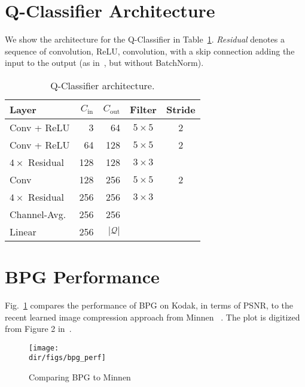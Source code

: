 \begin{subappendices} 
\appendixheader

\section{Q-Classifier Architecture}
\label{rc:sec:qcarch}

We show the architecture for the Q-Classifier in Table~\ref{rc:table:qcarch}. \emph{Residual} denotes a sequence of convolution, ReLU, convolution, with a skip connection adding the input to the output (as in~\cite{he2016deep}, but without BatchNorm).

\begin{table}[h!]
    \centering
    \begin{tabular}{lrrcc}
        \toprule
        Layer &  $C_\text{in}$ & $C_\text{out}$ & Filter & Stride 
        \\ \midrule 
        Conv + ReLU  & 3 & 64 & $5{\times}5$ & 2 \\
        Conv + ReLU & 64 & 128 & $5{\times}5$ & 2 \\
        $4\times$ Residual &  128 & 128 & $3{\times}3$ \\ 
        Conv & 128 & 256 & $5{\times}5$ & 2 \\
        $4\times$ Residual & 256 & 256 & $3{\times}3$ \\ 
        Channel-Avg. & 256 & 256 & \\ 
        Linear & 256 & $|\mathcal{Q}|$ & \\ 
        \bottomrule
    \end{tabular}
    \caption{\label{rc:table:qcarch}Q-Classifier architecture.}
\end{table}

\section{BPG Performance}

Fig.~\ref{rc:fig:bpg_perf} compares the performance of BPG on Kodak, in terms of PSNR, to the recent learned image compression approach from Minnen \etal~\cite{minnen2018joint}. The plot is digitized from Figure 2 in~\cite{minnen2018joint}.

\begin{figure}[h!]
\centering
\hspace{-2em}\texttt{[image: \\dir/figs/bpg\_perf]}
\caption{\label{rc:fig:bpg_perf}%
Comparing BPG to Minnen \etal~\cite{minnen2018joint}}
\end{figure}


\end{subappendices}
